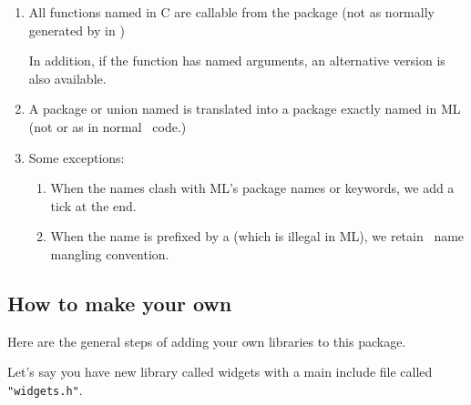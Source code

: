 \documentclass{article}
\begin{document}
\begin{enumerate}
    \item  All functions named  in C are callable from
         the package  (not  as normally
      generated by in \mlnlffigen)

         In addition, if the function has named arguments, an alternative
         version  is also available.

    \item  A package or union named  is translated into
         a package exactly named  in ML 
       (not  or  as in normal \mlnlffigen\ code.)

    \item  Some exceptions:

     \begin{enumerate}
       \item When the names clash with ML's package names or keywords,
           we add a tick at the end.
       \item When the name is prefixed by a \Sml{_} (which is illegal in ML),
           we retain \mlnlffigen\ name mangling convention.
    \end{enumerate}
\end{enumerate}

\subsection{How to make your own}

   Here are the general steps of adding your own libraries to this package.

Let's say you have new library called widgets with a main include file
called {\tt "widgets.h"}.
\end{document}
